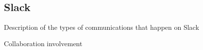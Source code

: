 \subsection{Slack}

Description of the types of communications that happen on Slack

Collaboration involvement


